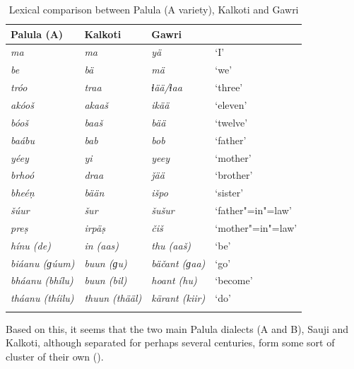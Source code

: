 \begin{table}[ht]
\caption{Lexical comparison between Palula (A variety), Kalkoti and Gawri}
\begin{tabularx}{\textwidth}{ Q Q Q Q }
\lsptoprule
Palula (A) &
Kalkoti &
Gawri &
\\\hline
\textit{ma} &
\textit{ma} &
\textit{yä} &
`I'\\
\textit{be} &
\textit{bä} &
\textit{mä} &
`we'\\
\textit{tróo} &
\textit{traa} &
\textit{ɬää/‌ɬaa} &
`three'\\
\textit{akóoš} &
\textit{akaaš} &
\textit{ikää} &
`eleven'\\
\textit{bóoš} &
\textit{baaš} &
\textit{bää} &
`twelve'\\
\textit{baábu} &
\textit{bab} &
\textit{bob} &
`father'\\
\textit{yéey} &
\textit{yi} &
\textit{yeey} &
`mother'\\
\textit{brhoó} &
\textit{draa} &
\textit{ǰää} &
`brother'\\
\textit{bheéṇ} &
\textit{bään} &
\textit{išpo} &
`sister'\\
\textit{šúur} &
\textit{šur} &
\textit{šušur} &
`father"=in"=law'\\
\textit{preṣ} &
\textit{irpäṣ} &
\textit{čiš} &
`mother"=in"=law'\\
\textit{hínu (de)} &
\textit{in (aas)} &
\textit{thu (aaš)} &
`be'\\
\textit{biáanu (ɡúum)} &
\textit{buun (ɡu)} &
\textit{bäčant (ɡaa)} &
`go'\\
\textit{bháanu (bhílu)} &
\textit{buun (bil)} &
\textit{hoant (hu)} &
`become'\\
\textit{tháanu (thíilu)} &
\textit{thuun (thääl)} &
\textit{kärant (kiir)} &
`do'\\\lspbottomrule
\end{tabularx}
\label{tab:1-3}
\end{table}

 
Based on this, it seems that the two main Palula dialects (A and B), Sauji and Kalkoti, although separated for perhaps several centuries, form some sort of cluster of their own (\citealt{liljegren2009}).

